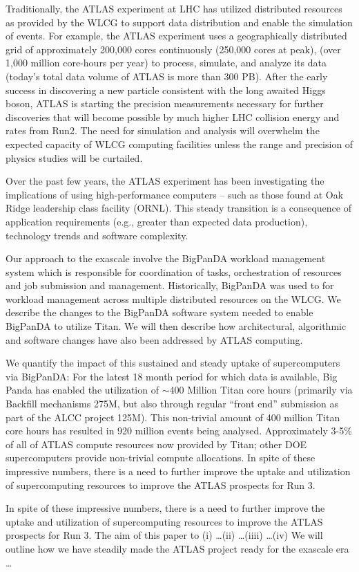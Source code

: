 

Traditionally, the ATLAS experiment at LHC has utilized distributed resources
as provided by the WLCG to support data distribution and enable the simulation
of events.  For example, the ATLAS experiment uses a geographically distributed
grid of approximately 200,000 cores continuously (250,000 cores at peak), (over
1,000 million core-hours per year) to process, simulate, and analyze its data
(today's total data volume of ATLAS is more than 300 PB). After the early
success in discovering a new particle consistent with the long awaited Higgs
boson, ATLAS is starting the precision measurements necessary for further
discoveries that will become possible by much higher LHC collision energy and
rates from Run2. The need for simulation and analysis will overwhelm the
expected capacity of WLCG computing facilities unless the range and precision
of physics studies will be curtailed.

Over the past few years, the ATLAS experiment has been investigating the
implications of using high-performance computers -- such as those found at Oak
Ridge leadership class facility (ORNL). This steady transition is a consequence
of application requirements (e.g., greater than expected data production),
technology trends and software complexity.

Our approach to the exascale involve the BigPanDA workload management system
which is responsible for coordination of tasks, orchestration of resources and
job submission and management. Historically, BigPanDA was used to for workload
management across multiple distributed resources on the WLCG. We describe the
changes to the BigPanDA software system needed to enable BigPanDA to utilize
Titan. We will then describe how architectural, algorithmic and software
changes have also been addressed by ATLAS computing.

We quantify the impact of this sustained and steady uptake of supercomputers
via BigPanDA: For the latest 18 month period for which data is available, Big
Panda has enabled the utilization of $\sim$400 Million Titan core
hours (primarily via Backfill mechanisms 275M, but also through regular ``front
end'' submission as part of the ALCC project 125M). This non-trivial amount of
400 million Titan core hours has resulted in 920 million events being analysed.
Approximately 3-5\% of all of ATLAS compute resources now provided by Titan;
other DOE supercomputers provide non-trivial compute allocations. In spite of
these impressive numbers, there is a need to further improve the uptake and
utilization of supercomputing resources to improve the ATLAS prospects for Run
3. 

In spite of these impressive numbers, there is a need to further improve the
uptake and utilization of supercomputing resources to improve the ATLAS
prospects for Run 3. The aim of this paper to (i) \ldots (ii) \ldots (iiii)
\ldots (iv) We will outline how we have steadily made the ATLAS project ready
for the exascale era \ldots 

